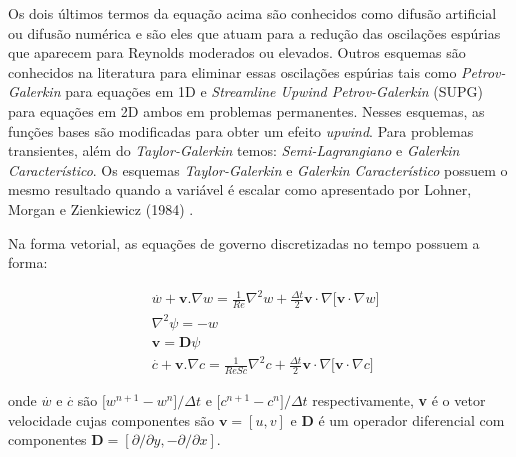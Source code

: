 \medskip
\noindent
Os dois últimos termos da equação acima são conhecidos como
difusão artificial ou difusão numérica e são eles que atuam
para a redução das oscilações espúrias que aparecem para 
Reynolds moderados ou elevados.
Outros esquemas são conhecidos na literatura para eliminar essas
oscilações espúrias tais como \textit{Petrov-Galerkin} para
equações em 1D e \textit{Streamline Upwind Petrov-Galerkin} (SUPG)
para equações em 2D ambos em problemas permanentes. Nesses
esquemas, as funções bases são modificadas para obter um efeito
\textit{upwind}. Para problemas transientes, além do 
\textit{Taylor-Galerkin} temos: \textit{Semi-Lagrangiano} e
\textit{Galerkin Característico}. 
Os esquemas \textit{Taylor-Galerkin} e 
\textit{Galerkin Característico} possuem o mesmo resultado 
quando a variável é escalar como apresentado por Lohner, Morgan e Zienkiewicz (1984) \cite{lohner1984}. 

\medskip
\noindent
Na forma vetorial, as equações de governo discretizadas no tempo
possuem a forma:

\begin{align}
& \overset{.}{w} + \textbf{v}.\nabla w = \frac{1}{Re} \nabla^2 w 
 + \frac{\Delta t}{2} \textbf{v} \cdot \nabla \big[ \textbf{v} \cdot \nabla w \big] \label{vorticity taylor-galerkin} \\[10pt]
& \nabla^2 \psi = - w \\[10pt]
& \textbf{v} = \textbf{D}\psi \\[10pt]
& \overset{.}{c} + \textbf{v}.\nabla c = \frac{1}{ReSc} \nabla^2 c
 + \frac{\Delta t}{2} \textbf{v} \cdot \nabla \big[ \textbf{v} \cdot \nabla c \big] \label{concentration taylor-galerkin}
\end{align}

\noindent
onde $\overset{.}{w}$ e
$\overset{.}{c}$ são 
$\big[ w^{n+1}-w^{n} \big] /\Delta t$ e
$\big[ c^{n+1}-c^{n} \big] /\Delta t$ respectivamente,
\textbf{v} é o vetor velocidade cujas componentes são
$ \textbf{v} = [u,v]$
e \textbf{D} é um operador diferencial com componentes
$ \textbf{D} = [\partial/\partial y, -\partial/\partial x]$.

\newpage
